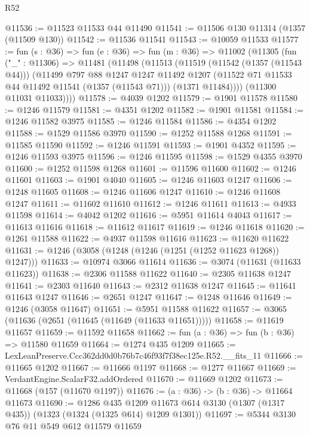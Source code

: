 \begin{lexlean}{R52}
\begin{coremodule}
@11536 := @11523 @11533 @44 @11490
@11541 := @11506 @130 @11314 (@1357 (@11509 @130))
@11542 := @11536 @11541
@11543 := @10059 @11533
@11577 := fun (s : @36) =>
  fun (e : @36) =>
  fun (m : @36) =>
  @11002
    (@11305
      (fun ("_" : @11306) =>
      @11481
        (@11498
          (@11513
            (@11519
              (@11542 (@1357 (@11543 @44)))
              (@11499
                @797
                @88
                @1247
                @1247
                @11492
                @1207
                (@11522 @71 @11533 @44 @11492 @11541 (@1357 (@11543 @71)))
                (@1371 @11484))))
          (@11300 @11031 @11033))))
@11578 := @4039 @1202
@11579 := @1901 @11578
@11580 := @1246 @11579
@11581 := @4351 @1202
@11582 := @1901 @11581
@11584 := @1246 @11582 @3975
@11585 := @1246 @11584
@11586 := @4354 @1202
@11588 := @1529 @11586 @3970
@11590 := @1252 @11588 @1268
@11591 := @11585 @11590
@11592 := @1246 @11591
@11593 := @1901 @4352
@11595 := @1246 @11593 @3975
@11596 := @1246 @11595
@11598 := @1529 @4355 @3970
@11600 := @1252 @11598 @1268
@11601 := @11596 @11600
@11602 := @1246 @11601
@11603 := @1901 @4040
@11605 := @1246 @11603 @1247
@11606 := @1248 @11605
@11608 := @1246 @11606 @1247
@11610 := @1246 @11608 @1247
@11611 := @11602 @11610
@11612 := @1246 @11611
@11613 := @4933 @11598
@11614 := @4042 @1202
@11616 := @5951 @11614 @4043
@11617 := @11613 @11616
@11618 := @11612 @11617
@11619 := @1246 @11618
@11620 := @1261 @11588
@11622 := @4937 @11598 @11616
@11623 := @11620 @11622
@11631 := @1246 (@3058 (@1248 (@1246 (@1251 (@1252 @11623 @1268)) @1247)))
@11633 := @10974 @3066 @11614
@11636 := @3074 (@11631 (@11633 @11623))
@11638 := @2306 @11588 @11622
@11640 := @2305 @11638 @1247
@11641 := @2303 @11640
@11643 := @2312 @11638 @1247
@11645 := @11641 @11643 @1247
@11646 := @2651 @1247
@11647 := @1248 @11646
@11649 := @1246 (@3058 @11647)
@11651 := @5951 @11588 @11622
@11657 := @3065 (@11636 (@2651 (@11645 (@11649 (@11633 @11651)))))
@11658 := @11619 @11657
@11659 := @11592 @11658
@11662 := fun (a : @36) => fun (b : @36) => @11580 @11659
@11664 := @1274 @435 @1209
@11665 := LexLeanPreserve.Ccc362dd0d0b76b7c46f93f7f38ec125e.R52.__fits_11
@11666 := @11665 @1202
@11667 := @11666 @1197
@11668 := @1277 @11667
@11669 := VerdantEngine.ScalarF32.addOrdered
@11670 := @11669 @1202
@11673 := @11668 (@157 (@11670 @1197))
@11676 := (a : @36) -> (b : @36) -> @11664 @11673
@11690 := @1286
    @435
    @1209
    @11673
    @614
    @3130
    (@1307 (@1317 @435))
    (@1323 (@1324 (@1325 @614) @1209 @1301))
@11697 := @5344 @3130 @76 @11 @549 @612 @11579 @11659

\end{coremodule}
\end{lexlean}
